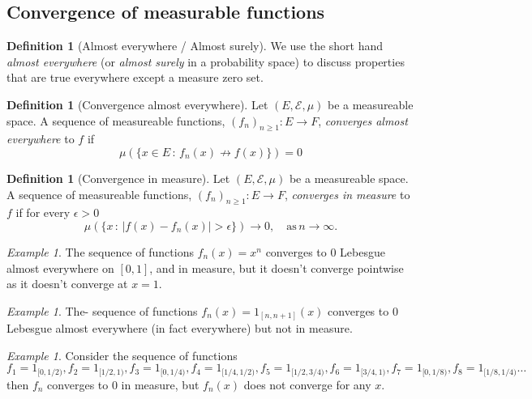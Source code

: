 \documentclass[11pt]{article}
\theoremstyle{definition}
\newtheorem{dfn}[thm]{Definition}
\theoremstyle{remark}
\newtheorem{ex}[thm]{Example}
\begin{document}
\subsection{Convergence of measurable functions}
\begin{dfn}[Almost everywhere / Almost surely]
We use the short hand \emph{almost everywhere} (or \emph{almost surely} in a probability space) to discuss properties that are true everywhere except a measure zero set. 
\end{dfn}

\begin{dfn}[Convergence almost everywhere] Let $(E, \mathcal{E}, \mu)$ be a measureable space. A sequence of measureable functions, $(f_n)_{n \geq 1}: E \rightarrow F$, \emph{converges almost everywhere} to $f$ if 
\[ \mu \left( \{ x \in E \,:\, f_n(x) \not\to f(x) \} \right) = 0 \]
\end{dfn}

\begin{dfn}[Convergence in measure]
Let $(E, \mathcal{E}, \mu)$ be a measureable space. A sequence of measureable functions, $(f_n)_{n \geq 1}: E \rightarrow F$, \emph{converges in measure} to $f$ if for every $\epsilon > 0$
\[ \mu \left( \{ x \, :\, |f(x) - f_n(x)| > \epsilon \} \right) \rightarrow 0, \quad \mbox{as}\, n \rightarrow \infty. \]
\end{dfn}

\begin{ex}
The sequence of functions $f_n(x) = x^n$ converges to $0$ Lebesgue almost everywhere on $[0,1]$, and in measure, but it doesn't converge pointwise as it doesn't converge at $x=1$.
\end{ex}
\begin{ex}
The- sequence of functions $f_n(x) = 1_{[n,n+1]}(x)$ converges to 0 Lebesgue almost everywhere (in fact everywhere) but not in measure.
\end{ex}
\begin{ex}
Consider the sequence of functions $f_1 = 1_{[0,1/2)}, f_2 = 1_{[1/2, 1)}, f_3 = 1_{[0,1/4)}, f_4 = 1_{[1/4, 1/2)}, f_5= 1_{[1/2, 3/4)}, f_6 = 1_{[3/4,1)}, f_7 = 1_{[0,1/8)}, f_8 = 1_{[1/8, 1/4)} \dots$ then $f_n$ converges to 0 in measure, but $f_n(x)$ does not converge for any $x$. 
\end{ex}
\end{document}
